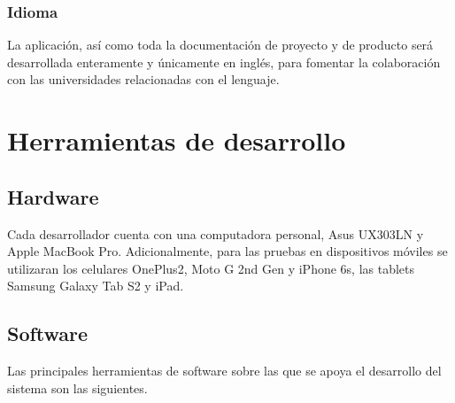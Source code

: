 \documentclass[a4paper,11pt]{article}
\begin{document}
\subsubsection{Idioma}

La aplicación, así como toda la documentación de proyecto y de producto será
desarrollada enteramente y únicamente en inglés, para fomentar la colaboración
con las universidades relacionadas con el lenguaje.

\section{Herramientas de desarrollo}

\subsection{Hardware}

Cada desarrollador cuenta con una computadora personal, Asus UX303LN y Apple
MacBook Pro. Adicionalmente, para las pruebas en dispositivos móviles se
utilizaran los celulares OnePlus2, Moto G 2nd Gen y iPhone 6s, las tablets
Samsung Galaxy Tab S2 y iPad.

\subsection{Software}

Las principales herramientas de software sobre las que se apoya el desarrollo
del sistema son las siguientes.
\end{document}
